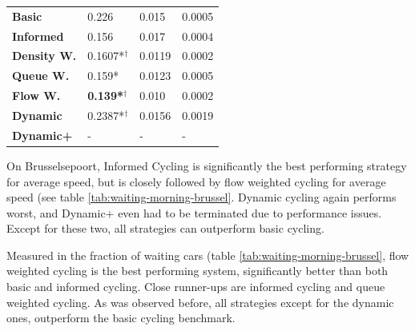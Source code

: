 \documentclass[11pt]{article}
\begin{document}
\begin{table}[t]
\begin{tabular}{l|l|l|l|}
\hline\textbf{Basic}      & 0.226          & 0.015             & 0.0005                     \\
\textbf{Informed}   & 0.156          & 0.017             & 0.0004                     \\
\hline\textbf{Density W.} & 0.1607*$^\dagger$         & 0.0119            & 0.0002                     \\
\textbf{Queue W.}   & 0.159*          & 0.0123            & 0.0005                     \\
\textbf{Flow W.}    & \textbf{0.139*$^\dagger$} & 0.010             & 0.0002                     \\
\textbf{Dynamic}    & 0.2387*$^\dagger$         & 0.0156            & 0.0019                     \\
\textbf{Dynamic+}   & -              & -                 & -                         
\end{tabular}
\end{table}

On Brusselsepoort, Informed Cycling is significantly the best performing strategy for average speed, but is closely followed by flow weighted cycling for average speed (see table \ref{tab:waiting-morning-brussel}. Dynamic cycling again performs worst, and Dynamic+ even had to be terminated due to performance issues. Except for these two, all strategies can outperform basic cycling.

Measured in the fraction of waiting cars (table \ref{tab:waiting-morning-brussel}, flow weighted cycling is the best performing system, significantly better than both basic and informed cycling. Close runner-ups are informed cycling and queue weighted cycling. As was observed before, all strategies except for the dynamic ones, outperform the basic cycling benchmark.
\end{document}

